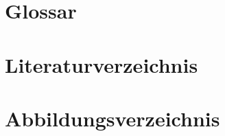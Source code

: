 \documentclass[12pt]{report}
\title{\thesisTitle}
\author{Johannes Schnirring}
\begin{document}
\pagestyle{fancy}
\renewcommand{\chaptermark}[1]{\markboth{#1}{#1}}
\fancyhead[R]{\thepage}
\fancyhead[L]{\chaptername\ \thechapter\ --\ \leftmark}



\setcounter{tocdepth}{1}\tableofcontents %








\chapter{Glossar}
\printglossaries

\chapter{Literaturverzeichnis}
\printbibliography[heading=none]

\begingroup
\chapter{Abbildungsverzeichnis}
\let\clearpage\relax
\renewcommand{\listfigurename}{}
\listoffigures
\endgroup



\end{document}

